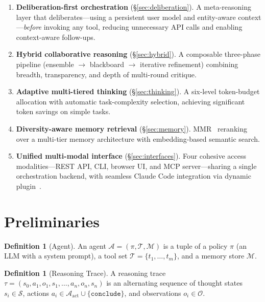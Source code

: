 \documentclass{article}
\theoremstyle{plain}
\theoremstyle{definition}
\newtheorem{definition}[theorem]{Definition}
\begin{document}
\begin{enumerate}
  \item \textbf{Deliberation-first orchestration} (\S\ref{sec:deliberation}).
    A meta-reasoning layer that deliberates---using a persistent user model
    and entity-aware context---\emph{before} invoking any tool, reducing
    unnecessary API calls and enabling context-aware follow-ups.

  \item \textbf{Hybrid collaborative reasoning}
    (\S\ref{sec:hybrid}).  A composable three-phase pipeline
    (ensemble $\to$ blackboard $\to$ iterative refinement) combining breadth,
    transparency, and depth of multi-round critique.

  \item \textbf{Adaptive multi-tiered thinking} (\S\ref{sec:thinking}).
    A six-level token-budget allocation with automatic task-complexity
    selection, achieving significant token savings on simple tasks.

  \item \textbf{Diversity-aware memory retrieval} (\S\ref{sec:memory}).
    MMR~\citep{carbonell1998mmr} reranking over a multi-tier memory
    architecture with embedding-based semantic search.

  \item \textbf{Unified multi-modal interface} (\S\ref{sec:interfaces}).
    Four cohesive access modalities---REST API, CLI, browser UI,
    and MCP server---sharing a single orchestration backend, with seamless
    Claude Code integration via dynamic plugin~\citep{anthropic2024mcp}.
\end{enumerate}

\section{Preliminaries}\label{sec:prelim}

\begin{definition}[Agent]
An agent $\mathcal{A} = (\pi, \mathcal{T}, \mathcal{M})$ is a tuple of a
policy $\pi$ (an LLM with a system prompt), a tool set
$\mathcal{T} = \{t_1, \ldots, t_m\}$, and a memory store $\mathcal{M}$.
\end{definition}

\begin{definition}[Reasoning Trace]
A reasoning trace $\tau = (s_0, a_1, o_1, s_1, \ldots, a_n, o_n, s_n)$ is an
alternating sequence of thought states $s_i \in \mathcal{S}$, actions
$a_i \in \mathcal{A}_{\mathrm{act}} \cup \{\texttt{conclude}\}$, and
observations $o_i \in \mathcal{O}$.
\end{definition}
\end{document}
